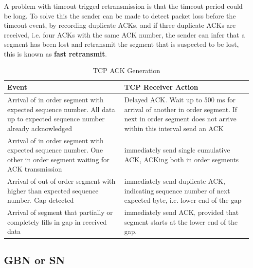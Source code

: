 \documentclass[12pt letter]{report}
\begin{document}
A problem with timeout trigged retransmission is that the timeout
period could be long. To solve this the sender can be made to detect
packet loss before the timeout event, by recording duplicate ACKs,
and if three duplicate ACKs are received, i.e. four ACKs with the
same ACK number, the sender can infer that a segment has been lost and
retransmit the segment that is suspected to be lost, this is known as
\textbf{fast retransmit}.

\begin{table}[H]
  \begin{center}
    \begin{tabularx}{\textwidth}{|X|X|}
      \hline
      Event & TCP Receiver Action \\
      \hline
      Arrival of in order segment with expected sequence number. All
      data up to expected sequence number already acknowledged  &
      Delayed ACK. Wait up to 500 ms for arrival of another in order
      segment. If next in order segment does not arrive within this
      interval send an ACK  \\
      \hline
      Arrival of in order segment with expected sequence number. One
      other in order segment waiting for ACK transmission &
      immediately send single cumulative ACK, ACKing both in order segments \\
      \hline
      Arrival of out of order segment with higher than expected
      sequence number. Gap detected & immediately send duplicate ACK,
      indicating sequence number of next expected byte, i.e. lower
      end of the gap \\
      \hline
      Arrival of segment that partially or completely fills in gap in
      received data & immediately send ACK, provided that segment
      starts at the lower end of the gap. \\
      \hline
    \end{tabularx}
  \end{center}
  \caption{TCP ACK Generation}\label{tab:}
\end{table}

\subsection{GBN or SN}
\end{document}
